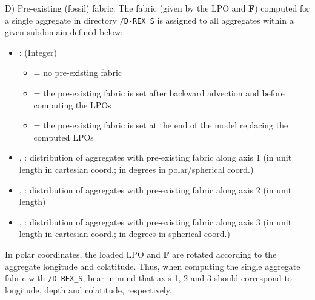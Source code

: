 D) Pre-existing (fossil) fabric. The fabric (given by the LPO and \textbf{F}) computed for a single aggregate in directory \texttt{/D-REX\_S} is assigned to all aggregates within a given subdomain defined below:
\begin{itemize}
    \item {}: (Integer)
    \begin{itemize}
        \item[]  = no pre-existing fabric 
        \item[]  = the pre-existing fabric is set after backward advection and before computing the LPOs 
        \item[]  = the pre-existing fabric is set at the end of the model replacing the computed LPOs
    \end{itemize}
    \item {}, : distribution of aggregates with pre-existing fabric along axis 1 (in unit length in cartesian coord.; in degrees in polar/spherical coord.)
    \item {}, : distribution of aggregates with pre-existing fabric along axis 2 (in unit length)
    \item {}, : distribution of aggregates with pre-existing fabric along axis 3 (in unit length in cartesian coord.; in degrees in spherical coord.)
\end{itemize}
In polar coordinates, the loaded LPO and \textbf{F} are rotated according to the aggregate longitude and colatitude. Thus, when computing the single aggregate fabric with \texttt{/D-REX\_S}, bear in mind that axis 1, 2 and 3 should correspond to longitude, depth and colatitude, respectively. 
\vspace{1cm}

